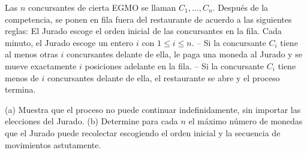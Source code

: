 Las $n$ concursantes de cierta EGMO se llaman $C_1, \dots , C_n$. Después de la competencia,
se ponen en fila fuera del restaurante de acuerdo a las siguientes reglas:
El Jurado escoge el orden inicial de las concursantes en la fila.
Cada minuto, el Jurado escoge un entero $i$ con $1 \le i \le n$.
– Si la concursante $C_i$ tiene al menos otras $i$ concursantes delante de ella, le paga una moneda
al Jurado y se mueve exactamente $i$ posiciones adelante en la fila.
– Si la concursante $C_i$ tiene menos de $i$ concursantes delante de ella, el restaurante se abre y
el proceso termina.

(a) Muestra que el proceso no puede continuar indefinidamente, sin importar las elecciones del
Jurado.
(b) Determine para cada $n$ el máximo número de monedas que el Jurado puede recolectar escogiendo
el orden inicial y la secuencia de movimientos astutamente.
